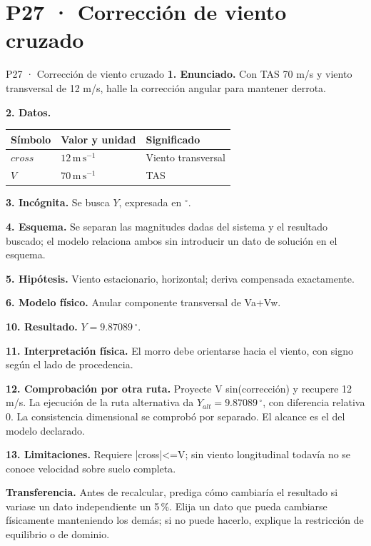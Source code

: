 \chapter*{P27 · Corrección de viento cruzado}
\begin{studiumworked}{P27 · Corrección de viento cruzado}
\textbf{1. Enunciado.} Con TAS 70 m/s y viento transversal de 12 m/s, halle la corrección angular para mantener derrota.

\textbf{2. Datos.}
\begin{longtable}{p{.16\linewidth}p{.35\linewidth}p{.38\linewidth}}\toprule Símbolo & Valor y unidad & Significado\\\midrule\endhead
$cross$ & $12\,\mathrm{m\,s^{-1}}$ & Viento transversal\\
$V$ & $70\,\mathrm{m\,s^{-1}}$ & TAS\\
\bottomrule\end{longtable}
\textbf{3. Incógnita.} Se busca $Y$, expresada en ${}^\circ$.

\textbf{4. Esquema.} Se separan las magnitudes dadas del sistema y el resultado buscado; el modelo relaciona ambos sin introducir un dato de solución en el esquema.

\textbf{5. Hipótesis.} Viento estacionario, horizontal; deriva compensada exactamente.

\textbf{6. Modelo físico.} Anular componente transversal de Va+Vw.


\textbf{10. Resultado.} $Y=9.87089\,{}^\circ$.

\textbf{11. Interpretación física.} El morro debe orientarse hacia el viento, con signo según el lado de procedencia.

\textbf{12. Comprobación por otra ruta.} Proyecte V sin(corrección) y recupere 12 m/s. La ejecución de la ruta alternativa da $Y_{alt}=9.87089\,{}^\circ$, con diferencia relativa $0$. La consistencia dimensional se comprobó por separado. El alcance es el del modelo declarado.

\textbf{13. Limitaciones.} Requiere |cross|<=V; sin viento longitudinal todavía no se conoce velocidad sobre suelo completa.

\textbf{Transferencia.} Antes de recalcular, prediga cómo cambiaría el resultado si variase un dato independiente un 5\,\%. Elija un dato que pueda cambiarse físicamente manteniendo los demás; si no puede hacerlo, explique la restricción de equilibrio o de dominio.\par
\end{studiumworked}
